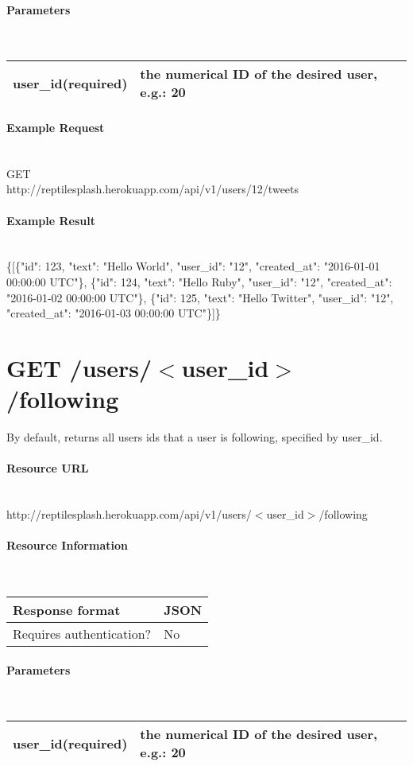 \documentclass{article}
\begin{document}
	\paragraph{Parameters} \mbox{} \\
	\begin{tabular}{ll}
		\hline
		user\_id(required) & the numerical ID of the desired user, e.g.: 20 \\ \hline
	\end{tabular}
	\paragraph{Example Request} \mbox{} \\
	GET \\
	http://reptilesplash.herokuapp.com/api/v1/users/12/tweets 
	\paragraph{Example Result} \mbox{} \\
	\{[\{"id": 123, "text": "Hello World", "user\_id": "12", "created\_at": "2016-01-01 00:00:00 UTC"\}, \{"id": 124, "text": "Hello Ruby", "user\_id": "12", "created\_at": "2016-01-02 00:00:00 UTC"\}, \{"id": 125, "text": "Hello Twitter", "user\_id": "12", "created\_at": "2016-01-03 00:00:00 UTC"\}]\}


	\section*{GET /users/$<$user\_id$>$/following}
	By default, returns all users ids that a user is following, specified by user\_id. 
	\paragraph{Resource URL} \mbox{} \\
	http://reptilesplash.herokuapp.com/api/v1/users/$<$user\_id$>$/following
	\paragraph{Resource Information} \mbox{} \\
	\begin{tabular}{ll}
		\hline
		Response format & JSON \\ \hline
		Requires authentication? & No \\ \hline
	\end{tabular}
	\paragraph{Parameters} \mbox{} \\
	\begin{tabular}{ll}
		\hline
		user\_id(required) & the numerical ID of the desired user, e.g.: 20 \\ \hline
	\end{tabular}
\end{document}
